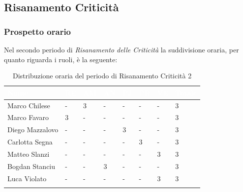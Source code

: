 \newpage
\subsection{Risanamento Criticità}
\label{PRC2}

\subsubsection{Prospetto orario}
Nel secondo periodo di \textit{Risanamento delle Criticità} la suddivisione oraria, per quanto riguarda i ruoli, è la seguente: 


\begin{longtable}{|C{.30\textwidth}|C{.06\textwidth}|C{.06\textwidth}|C{.06\textwidth} | C{.06\textwidth}| C{.06\textwidth} | C{.06\textwidth} | C{.10\textwidth} |}
\hline
{}	\textbf{\textcolor{white}{Nome}} & \textbf{\textcolor{white}{RE}} & \textbf{\textcolor{white}{AM}} & \textbf{\textcolor{white}{AN}} & \textbf{\textcolor{white}{PJ}} & \textbf{\textcolor{white}{PR}} & \textbf{\textcolor{white}{VE}} & \textbf{\textcolor{white}{Totale}}\\
\hline 
Marco Chilese & - & 3 & - & - & - & - & 3 \\
\hline
{}Marco Favaro & 3 & - & - & - & - & - & 3 \\
\hline
Diego Mazzalovo & - & - & - & 3 & - & - & 3 \\
\hline
{}Carlotta Segna & - & - & - & - & 3 & - & 3 \\
\hline
Matteo Slanzi & - & - & - & - & - & 3 & 3 \\
\hline
{}Bogdan Stanciu & - & - & 3 & - & - & - & 3 \\
\hline
Luca Violato & - & - & - & - & - & 3 & 3 \\   
\hline


\caption{Distribuzione oraria del periodo di Risanamento Criticità 2}
\label{Distribuzione oraria rc2}
\end{longtable}

